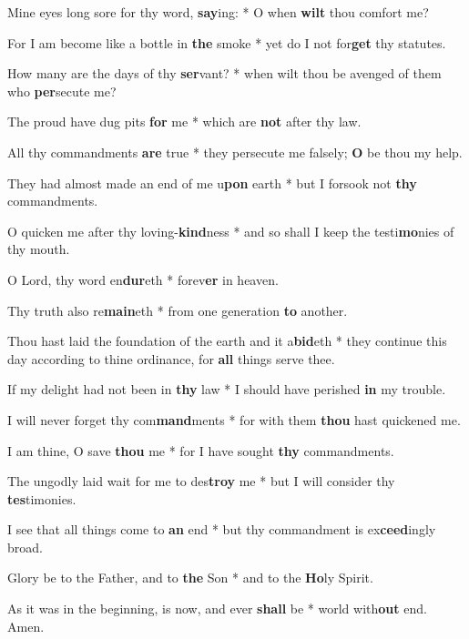 \begin{multicols}{2}
	Mine eyes long sore for thy word, \textbf{say}ing: * O when \textbf{wilt} thou comfort me?
	
	For I am become like a bottle in \textbf{the} smoke * yet do I not for\textbf{get} thy statutes.
	
	How many are the days of thy \textbf{ser}vant? * when wilt thou be avenged of them who \textbf{per}secute me?
	
	The proud have dug pits \textbf{for} me * which are \textbf{not} after thy law.
	
	All thy commandments \textbf{are} true * they persecute me falsely; \textbf{O} be thou my help.
	
	They had almost made an end of me u\textbf{pon} earth * but I forsook not \textbf{thy} commandments.
	
	O quicken me after thy loving-\textbf{kind}ness * and so shall I keep the testi\textbf{mo}nies of thy mouth.
	
	O Lord, thy word en\textbf{dur}eth * forev\textbf{er} in heaven.
	
	Thy truth also re\textbf{main}eth * from one generation \textbf{to} another.
	
	Thou hast laid the foundation of the earth and it a\textbf{bid}eth * they continue this day according to thine ordinance, for \textbf{all} things serve thee.
	
	If my delight had not been in \textbf{thy} law * I should have perished \textbf{in} my trouble.
	
	I will never forget thy com\textbf{mand}ments * for with them \textbf{thou} hast quickened me.
	
	I am thine, O save \textbf{thou} me * for I have sought \textbf{thy} commandments.
	
	The ungodly laid wait for me to des\textbf{troy} me * but I will consider thy \textbf{tes}timonies.
	
	I see that all things come to \textbf{an} end * but thy commandment is ex\textbf{ceed}ingly broad.
	
	Glory be to the Father, and to \textbf{the} Son * and to the \textbf{Ho}ly Spirit.
	
	As it was in the beginning, is now, and ever \textbf{shall} be * world with\textbf{out} end. Amen.
\end{multicols}